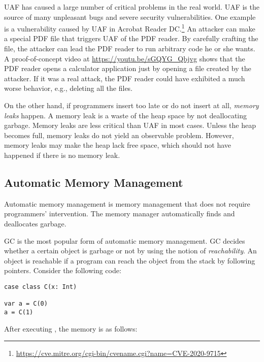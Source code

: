 UAF has caused a large number of critical problems in the real world. UAF is the
source of many unpleasant bugs and severe security vulnerabilities.  One example
is a vulnerability caused by UAF in Acrobat Reader
DC.\footnote{\url{https://cve.mitre.org/cgi-bin/cvename.cgi?name=CVE-2020-9715}}
An attacker can make a special PDF file that triggers UAF of the PDF reader. By
carefully crafting the file, the attacker can lead the PDF reader to run
arbitrary code he or she wants. A proof-of-concept video at
\url{https://youtu.be/sGQYG_Qbjvg} shows that the PDF reader opens a calculator
application just by opening a file created by the attacker. If it was a real
attack, the PDF reader could have exhibited a much worse behavior, e.g.,
deleting all the files.

On the other hand, if programmers insert  too late or do not insert
at all, \textit{memory leaks} happen. A memory leak is a
waste of the heap space by not deallocating garbage. Memory leaks are less
critical than UAF in most cases. Unless the heap becomes full, memory leaks do
not yield an observable problem. However, memory leaks may make the heap lack
free space, which should not have happened if there is no memory leak.

\subsection{Automatic Memory Management}

Automatic memory management is memory management that does not require
programmers' intervention. The memory manager automatically finds and
deallocates garbage.

GC is the most popular form of automatic memory management. GC decides whether
a certain object is garbage or not by using the notion of
\textit{reachability}. An object is reachable if a program
can reach the object from the stack by following pointers. Consider the
following code:

\begin{verbatim}
case class C(x: Int)

var a = C(0)
a = C(1)
\end{verbatim}

After executing , the memory is as follows:

